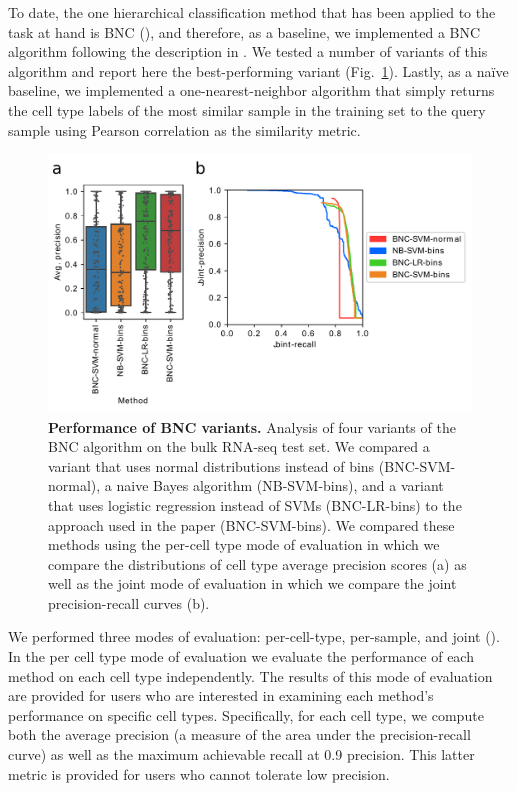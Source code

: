 To date, the one hierarchical classification method that has been applied to the task at hand is BNC (\citealp{BarutcuogluSchapireTroyanskaya2006}), and therefore, as a baseline, we implemented a BNC algorithm following the description in \cite{Lee2013}.  We tested a number of variants of this algorithm and report here the best-performing variant (Fig.~\ref{fig:bncvariants}).  Lastly, as a na\"ive baseline, we implemented a one-nearest-neighbor algorithm that simply returns the cell type labels of the most similar sample in the training set to the query sample using Pearson correlation as the similarity metric.  

\begin{figure}[htbp]
    \centerline{\includegraphics[width=13cm]{figures/bulk_test_bnc_results.pdf}}
    \caption{\textbf{Performance of BNC variants.} Analysis of four variants of the BNC algorithm on the bulk RNA-seq test set.  We compared a variant that uses normal distributions instead of bins (BNC-SVM-normal), a naive Bayes algorithm (NB-SVM-bins), and a variant that uses logistic regression instead of SVMs (BNC-LR-bins) to the approach used in the paper (BNC-SVM-bins). We compared these methods using the per-cell type mode of evaluation in which we compare the distributions of cell type average precision scores (a) as well as the joint mode of evaluation in which we compare the joint precision-recall curves (b).}
    \label{fig:bncvariants}
      \end{figure}

We performed three modes of evaluation: per-cell-type, per-sample, and joint (\citealp{Obozinski2008}). In the per cell type mode of evaluation we evaluate the performance of each method on each cell type independently. The results of this mode of evaluation are provided for users who are interested in examining each method's performance on specific cell types. Specifically, for each cell type, we compute both the average precision (a measure of the area under the precision-recall curve) as well as the maximum achievable recall at 0.9 precision. This latter metric is provided for users who cannot tolerate low precision. 

